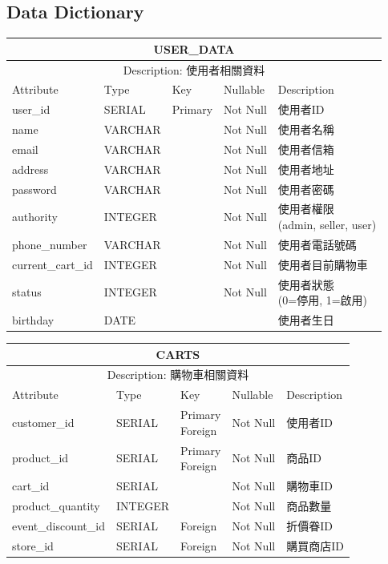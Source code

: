 \documentclass[a4paper, 12pt]{article}
\begin{document}
\subsection{Data Dictionary}
\noindent\begin{tabular}{ | p{7em} | p{5.5em} |p{5.5em} | p{4.5em} | p{11em} |}
  \hline
  \multicolumn{5}{|c|}{USER_DATA} \tabularnewline
  \hline 
  \multicolumn{5}{|c|}{Description: 使用者相關資料} \tabularnewline
  \hline 
  Attribute & Type & Key & Nullable & Description \\
  \hline
  user_id & SERIAL & Primary & Not Null & 使用者ID \\
  \hline
  name & VARCHAR & &Not Null &使用者名稱\\
  \hline
  email & VARCHAR & &Not Null &使用者信箱\\
  \hline
  address & VARCHAR & &Not Null &使用者地址\\
  \hline
  password & VARCHAR & &Not Null &使用者密碼\\
  \hline
  authority & INTEGER & &Not Null&\makecell[l]{使用者權限\\(admin, seller, user)} \\
  \hline
  phone_number & VARCHAR & &Not Null &使用者電話號碼\\
  \hline
  current_cart_id & INTEGER & &Not Null &使用者目前購物車\\
  \hline
  status & INTEGER & & Not Null & \makecell[l]{使用者狀態\\(0=停用, 1=啟用)}\\
  \hline
  birthday & DATE & &&使用者生日\\
  \hline
\end{tabular}
\vspace{1em}


\noindent\centering\begin{tabular}{ | p{7em} | p{5.5em} |p{5.5em} | p{4.5em} | p{11em} |}
  \hline
  \multicolumn{5}{|c|}{CARTS} \tabularnewline
  \hline 
  \multicolumn{5}{|c|}{Description: 購物車相關資料} \tabularnewline
  \hline 
  Attribute & Type & Key & Nullable & Description \\
  \hline
  customer_id& SERIAL & \makecell[l]{Primary \\ Foreign}  & Not Null & 使用者ID \\
  \hline
  product_id & SERIAL &\makecell[l]{Primary \\ Foreign} &Not Null &商品ID\\
  \hline
  cart_id & SERIAL & &Not Null &購物車ID\\
  \hline
  product_quantity & INTEGER & &Not Null &商品數量\\
  \hline
  event_discount_id & SERIAL & Foreign &Not Null &折價眷ID\\
  \hline
  store_id & SERIAL & Foreign & Not Null & 購買商店ID\\
  \hline
\end{tabular}
\vspace{1em}
\end{document}
